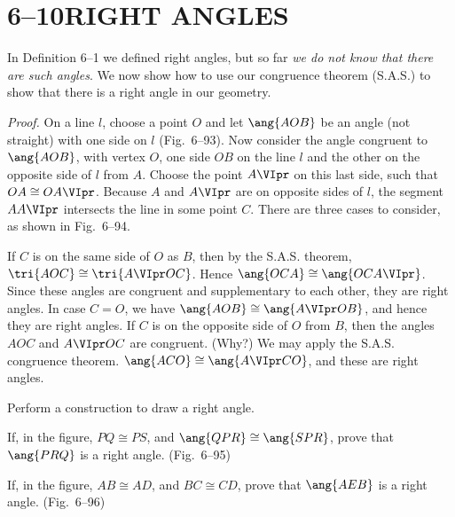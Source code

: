 \documentclass[11pt]{book}
\theoremstyle{bkplain}
\theoremstyle{XIplainnote}
\theoremstyle{bkplain}
\theoremstyle{bkplain}
\begin{document}
\section*{6--10\quad RIGHT ANGLES}

In Definition 6--1 we defined right angles, but so far \emph{we do not know
that there are such angles}. We now show how to use our congruence theorem
(S.A.S.) to show that there is a right angle in our geometry.

\FIGVININETYTHREE

\emph{Proof.} On a line $l$, choose a point $O$ and let $\ang{AOB}$ be an angle
(not straight) with one side on $l$ (Fig.~6--93). Now consider the angle
congruent to $\ang{AOB}$, with vertex $O$, one side $OB$ on the line $l$ and
the other on the opposite side of $l$ from $A$. Choose the point $A\VIpr$ on
this last side, such that $OA \cong OA\VIpr$. Because $A$ and $A\VIpr$ are on
opposite sides of $l$, the segment $AA\VIpr$ intersects the line in some point
$C$. There are three cases to consider, as shown in Fig.~6--94.

\FIGVININETYFOUR

If $C$ is on the same side of $O$ as $B$, then by the S.A.S. theorem,
$\tri{AOC} \cong \tri{A\VIpr OC}$. Hence $\ang{OCA} \cong \ang{OCA\VIpr}$.
Since these angles are congruent and supplementary to each other, they are
right angles. In case $C = O$, we have $\ang{AOB} \cong \ang{A\VIpr OB}$, and
hence they are right angles. If $C$ is on the opposite side of $O$ from $B$,
then the angles $AOC$ and $A\VIpr OC$ are congruent. (Why?) We may apply the
S.A.S. congruence theorem. $\ang{ACO} \cong \ang{A\VIpr CO}$, and these are
right angles.

\begin{exercisecols}
\begin{exlist}
\item Perform a construction to draw a right angle.
\item If, in the figure, $PQ \cong PS$, and $\ang{QPR} \cong \ang{SPR}$, prove
  that $\ang{PRQ}$ is a right angle. (Fig.~6--95)
\exfig{\FIGVININETYFIVE}
\item If, in the figure, $AB \cong AD$, and $BC \cong CD$, prove that
  $\ang{AEB}$ is a right angle. (Fig.~6--96)
\exfig{\FIGVININETYSIX}
\end{exlist}
\end{exercisecols}
\end{document}
